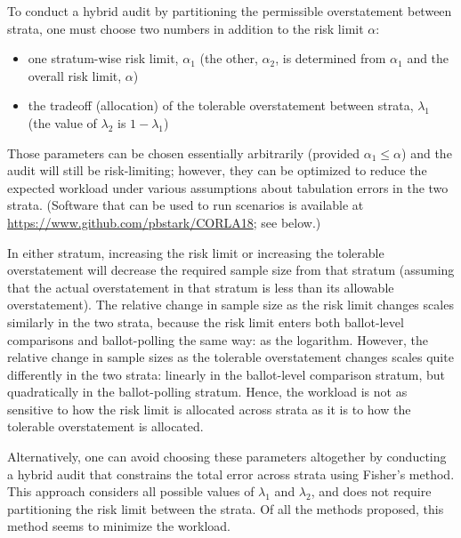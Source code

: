 \documentclass[12pt]{article}
\begin{document}
To conduct a hybrid audit by partitioning the permissible overstatement between strata, 
one must choose two numbers in addition to the risk limit $\alpha$:
\begin{itemize}
   \item one stratum-wise risk limit, $\alpha_1$ 
(the other, $\alpha_2$, is determined from $\alpha_1$ and the overall risk limit, $\alpha$)
   \item the tradeoff (allocation) of the tolerable overstatement between strata, $\lambda_1$
(the value of $\lambda_2$ is $1-\lambda_1$)
\end{itemize}
Those parameters can be chosen essentially arbitrarily (provided $\alpha_1 \le \alpha$)
and the audit will still be risk-limiting;
however, they can be optimized to reduce the expected workload under various
assumptions about tabulation errors in the two strata.
(Software that can be used to run scenarios is available at 
\url{https://www.github.com/pbstark/CORLA18}; see below.)

In either stratum, increasing the risk limit or increasing the tolerable overstatement will decrease
the required sample size from that stratum (assuming that the actual overstatement in
that stratum is less than its allowable overstatement).
The relative change in sample size as the risk limit changes scales similarly in the two strata, 
because the risk limit 
enters both ballot-level comparisons and ballot-polling the same way: as the logarithm.
However, the relative change in sample sizes as the tolerable overstatement changes
scales quite differently in the two strata: linearly in the ballot-level comparison stratum,
but quadratically in the ballot-polling stratum.
Hence, the workload is not as sensitive to how the risk limit is allocated across strata
as it is to how the tolerable overstatement is allocated.

Alternatively, one can avoid choosing these parameters altogether by conducting a 
hybrid audit that constrains the total error across strata using Fisher's method.
This approach considers all possible values of $\lambda_1$ and $\lambda_2$,
and does not require partitioning the risk limit between the strata.
Of all the methods proposed, this method seems to minimize the workload.
\end{document}
